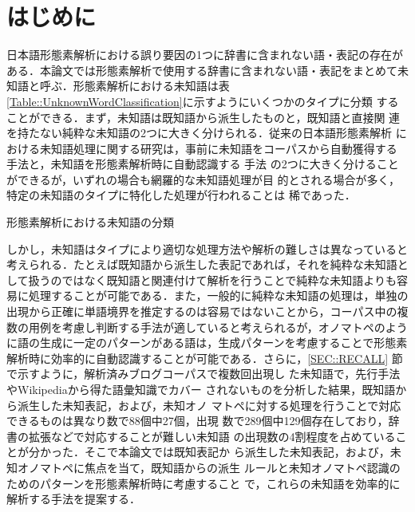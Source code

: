 \documentclass[japanese]{jnlp_1.4}
\begin{document}
\maketitle

\vspace{0.5\Cvs}
 \section{はじめに}

 日本語形態素解析における誤り要因の1つに辞書に含まれない語・表記の存在が
 ある．本論文では形態素解析で使用する辞書に含まれない語・表記をまとめて未
 知語と呼ぶ．形態素解析における未知語は表
 \ref{Table::UnknownWordClassification}に示すようにいくつかのタイプに分類
 することができる．まず，未知語は既知語から派生したものと，既知語と直接関
 連を持たない純粋な未知語の2つに大きく分けられる．従来の日本語形態素解析
 における未知語処理に関する研究は，事前に未知語をコーパスから自動獲得する
 手法\cite{Mori1996s,Murawaki2008}と，未知語を形態素解析時に自動認識する
 手法\cite{Nagata1999,Uchimoto2001,Asahara2004c,Azuma2006,Nakagawa2007a}
 の2つに大きく分けることができるが，いずれの場合も網羅的な未知語処理が目
 的とされる場合が多く，特定の未知語のタイプに特化した処理が行われることは
 稀であった．

 \begin{table}[t]
  \caption{形態素解析における未知語の分類}
\label{Table::UnknownWordClassification}

\end{table}

 しかし，未知語はタイプにより適切な処理方法や解析の難しさは異なっていると
 考えられる．たとえば既知語から派生した表記であれば，それを純粋な未知語と
 して扱うのではなく既知語と関連付けて解析を行うことで純粋な未知語よりも容
 易に処理することが可能である．また，一般的に純粋な未知語の処理は，単独の
 出現から正確に単語境界を推定するのは容易ではないことから，コーパス中の複
 数の用例を考慮し判断する手法が適していると考えられるが，オノマトペのよう
 に語の生成に一定のパターンがある語は，生成パターンを考慮することで形態素
 解析時に効率的に自動認識することが可能である．さらに，\ref{SEC::RECALL}
 節で示すように，解析済みブログコーパス\cite{Hashimoto2011}で複数回出現し
 た未知語で，先行手法\cite{Murawaki2008}やWikipediaから得た語彙知識でカバー
 されないものを分析した結果，既知語から派生した未知表記，および，未知オノ
 マトペに対する処理を行うことで対応できるものは異なり数で88個中27個，出現
 数で289個中129個存在しており，辞書の拡張などで対応することが難しい未知語
 の出現数の4割程度を占めていることが分かった．そこで本論文では既知表記か
 ら派生した未知表記，および，未知オノマトペに焦点を当て，既知語からの派生
 ルールと未知オノマトペ認識のためのパターンを形態素解析時に考慮すること
 で，これらの未知語を効率的に解析する手法を提案する．
\end{document}
